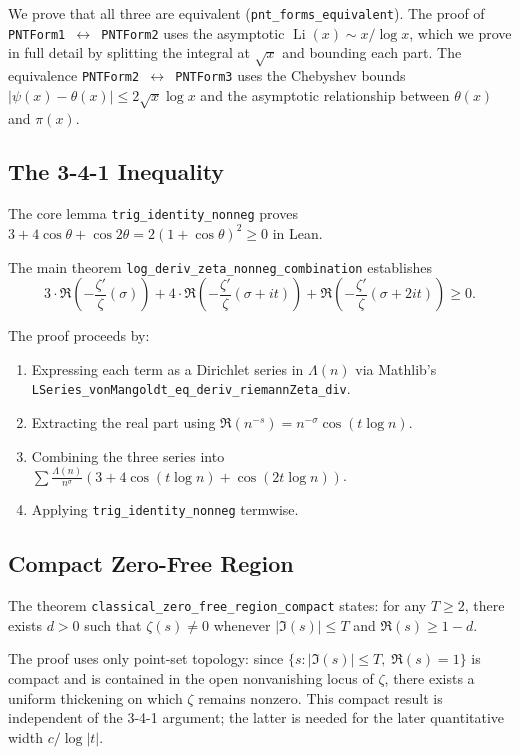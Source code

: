 \documentclass[11pt,a4paper]{article}
\theoremstyle{remark}
\begin{document}
We prove that all three are equivalent (\texttt{pnt\_forms\_equivalent}).
The proof of \texttt{PNTForm1~$\leftrightarrow$~PNTForm2} uses the
asymptotic $\operatorname{Li}(x)\sim x/\log x$, which we prove in full
detail by splitting the integral at $\sqrt{x}$ and bounding each part.
The equivalence \texttt{PNTForm2~$\leftrightarrow$~PNTForm3} uses the
Chebyshev bounds $|\psi(x)-\theta(x)|\leq 2\sqrt{x}\log x$ and the
asymptotic relationship between $\theta(x)$ and $\pi(x)$.

\subsection{The 3-4-1 Inequality}

The core lemma \texttt{trig\_identity\_nonneg} proves
$3+4\cos\theta+\cos 2\theta = 2(1+\cos\theta)^{2} \geq 0$ in Lean.

The main theorem \texttt{log\_deriv\_zeta\_nonneg\_combination} establishes
\[
3\cdot\Re\!\left(-\frac{\zeta'}{\zeta}(\sigma)\right)
+ 4\cdot\Re\!\left(-\frac{\zeta'}{\zeta}(\sigma+it)\right)
+ \Re\!\left(-\frac{\zeta'}{\zeta}(\sigma+2it)\right) \geq 0.
\]

The proof proceeds by:
\begin{enumerate}[noitemsep]
  \item Expressing each term as a Dirichlet series in $\Lambda(n)$ via
    Mathlib's \texttt{LSeries\_vonMangoldt\_eq\_deriv\_riemannZeta\_div}.
  \item Extracting the real part using
    $\Re(n^{-s}) = n^{-\sigma}\cos(t\log n)$.
  \item Combining the three series into
    $\sum \frac{\Lambda(n)}{n^{\sigma}}(3+4\cos(t\log n)+\cos(2t\log n))$.
  \item Applying \texttt{trig\_identity\_nonneg} termwise.
\end{enumerate}

\subsection{Compact Zero-Free Region}

The theorem \texttt{classical\_zero\_free\_region\_compact} states: for any
$T\geq 2$, there exists $d>0$ such that $\zeta(s)\neq 0$ whenever
$|\Im(s)|\leq T$ and $\Re(s)\geq 1-d$.

The proof uses only point-set topology: since $\{s:|\Im(s)|\leq T,\;
\Re(s)=1\}$ is compact and is contained in the open nonvanishing locus of
$\zeta$, there exists a uniform thickening on which $\zeta$ remains nonzero.
This compact result is independent of the 3-4-1 argument; the latter is needed
for the later quantitative width $c/\log|t|$.
\end{document}
